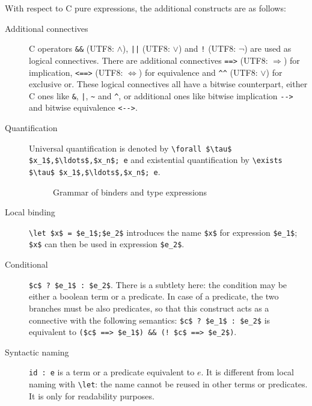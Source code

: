 With respect to C pure expressions, the additional constructs are as follows:
\begin{description}
\item[Additional connectives] C operators \lstinline|&&| (UTF8:
  $\land$), \lstinline+||+ (UTF8: $\lor$) and \lstinline|!| (UTF8:
  $\neg$) are used as logical connectives. There are additional
  connectives \lstinline|==>| (UTF8: $\Longrightarrow$) for
  implication, \lstinline|<==>| (UTF8: $\Longleftrightarrow$) for
  equivalence and \lstinline|^^| (UTF8: \underline{\ensuremath{\lor}})
  for exclusive
  or. These logical connectives all have a bitwise counterpart, either
  C ones like \lstinline|&|, \lstinline+|+, \lstinline|~| and
  \lstinline|^|, or additional ones like bitwise implication
  \lstinline|-->| and bitwise equivalence \lstinline|<-->|.

\item[Quantification] Universal quantification is denoted by
  \lstinline|\forall $\tau$ $x_1$,$\ldots$,$x_n$; e| and existential
  quantification by \lstinline|\exists $\tau$ $x_1$,$\ldots$,$x_n$; e|.

\begin{figure}[t]
  \begin{cadre} 
    \end{cadre}
  \caption{Grammar of binders and type expressions}
\label{fig:gram:binders}
\end{figure}

\item[Local binding]
    \lstinline|\let $x$ = $e_1$;$e_2$|
    introduces the name \lstinline|$x$| for
    expression \lstinline|$e_1$|; \lstinline|$x$| can then be used in expression
    \lstinline|$e_2$|.

\item[Conditional] \lstinline|$c$ ? $e_1$ : $e_2$|. There is a subtlety
  here: the condition may be either a boolean term or a predicate.  In
  case of a predicate, the two branches must be also predicates, so
  that this construct acts as a connective with the following
  semantics: \lstinline|$c$ ? $e_1$ : $e_2$| is equivalent to
  \lstinline|($c$ ==> $e_1$) && (! $c$ ==> $e_2$)|.

\item[Syntactic naming] \lstinline|id : e| is a term or a predicate
  equivalent to $e$. It is different from local naming with \lstinline|\let|:
  the name cannot be reused in other terms or predicates. It is only
  for readability purposes.


\end{description}
